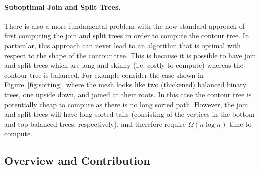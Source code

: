 \documentclass[11pt]{article}
\theoremstyle{definition}
\newcommand{\Fig}[1]{\hyperref[fig:#1]{Figure~\ref*{fig:#1}}} %
\begin{document}
\paragraph{Suboptimal Join and Split Trees.}
There is also a more fundamental problem with the now standard approach of first computing 
the join and split trees in order to compute the contour tree.  In particular, this approach 
can never lead to an algorithm that is optimal with respect to the shape of the contour tree.  
This is because it is possible to have join and split trees which are long and skinny (i.e. 
costly to compute) whereas the contour tree is balanced.  For example consider the case shown 
in \Fig{sorting}, where the mesh looks like two (thickened) balanced binary trees, one upside 
down, and joined at their roots.  In this case the contour tree is potentially cheap to 
compute as there is no long sorted path.  However, the join and split trees will have long 
sorted tails (consisting of the vertices in the bottom and top balanced trees, respectively), 
and therefore require $\Omega(n\log n)$ time to compute.

\subsection{Overview and Contribution}
\end{document}
